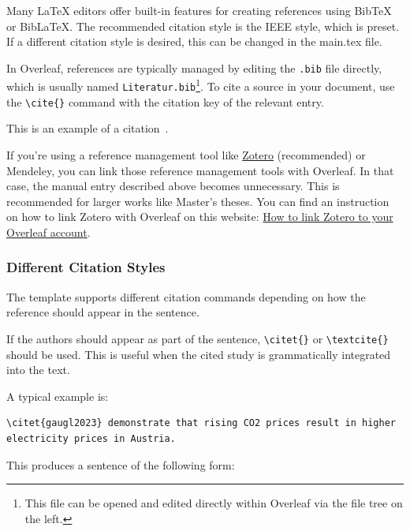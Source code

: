 \documentclass[a4paper, fleqn, headsepline, footsepline, 12pt, parskip=half]{scrartcl}
\begin{document}
Many LaTeX editors offer built-in features for creating references using BibTeX or BibLaTeX. The recommended citation style is the IEEE style, which is preset. If a different citation style is desired, this can be changed in the main.tex file.

In Overleaf, references are typically managed by editing the \texttt{.bib} file directly, which is usually named \texttt{Literatur.bib}\footnote{This file can be opened and edited directly within Overleaf via the file tree on the left.}. To cite a source in your document, use the \verb|\cite{}| command with the citation key of the relevant entry.

This is an example of a citation~\cite{Hunt2019}.

If you're using a reference management tool like \href{https://www.zotero.org}{Zotero} (recommended) or Mendeley, you can link those reference management tools with Overleaf. In that case, the manual entry described above becomes unnecessary. This is recommended for larger works like Master's theses. You can find an instruction on how to link Zotero with Overleaf on this website: \href{https://www.overleaf.com/learn/how-to/How_to_link_Zotero_to_your_Overleaf_account}{How to link Zotero to your Overleaf account}.

\subsubsection{Different Citation Styles}
\label{sec:citationStyles}

The template supports different citation commands depending on how the reference should appear in the sentence.

If the authors should appear as part of the sentence, \texttt{\textbackslash citet\{\}} or \texttt{\textbackslash textcite\{\}} should be used. This is useful when the cited study is grammatically integrated into the text.

A typical example is:
\begin{tcolorbox}[colback=black!5, colframe=black!35, boxrule=0.5pt, sharp corners]
\begin{verbatim}
\citet{gaugl2023} demonstrate that rising CO2 prices result in higher 
electricity prices in Austria.
\end{verbatim}
\end{tcolorbox}

This produces a sentence of the following form:
\end{document}

